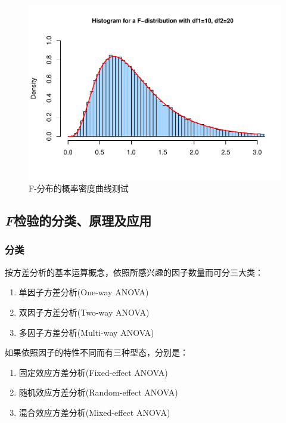 \documentclass[
]{article}
\providecommand{\tightlist}{%
  \setlength{\itemsep}{0pt}\setlength{\parskip}{0pt}}
\begin{document}
\begin{figure}

{\centering \includegraphics[width=0.49\linewidth]{figs/fdistri} 

}

\caption{F-分布的概率密度曲线测试}\label{fig:fdistri}
\end{figure}

\hypertarget{fux68c0ux9a8cux7684ux5206ux7c7bux539fux7406ux53caux5e94ux7528}{%
\subsection{\texorpdfstring{\emph{F}检验的分类、原理及应用}{F检验的分类、原理及应用}}\label{fux68c0ux9a8cux7684ux5206ux7c7bux539fux7406ux53caux5e94ux7528}}

\hypertarget{ux5206ux7c7b}{%
\subsubsection{分类}\label{ux5206ux7c7b}}

按方差分析的基本运算概念，依照所感兴趣的因子数量而可分三大类：

\begin{enumerate}
\def\labelenumi{\arabic{enumi}.}
\tightlist
\item
  单因子方差分析(One-way ANOVA)
\item
  双因子方差分析(Two-way ANOVA)
\item
  多因子方差分析(Multi-way ANOVA)
\end{enumerate}

如果依照因子的特性不同而有三种型态，分别是：

\begin{enumerate}
\def\labelenumi{\arabic{enumi}.}
\tightlist
\item
  固定效应方差分析(Fixed-effect ANOVA)
\item
  随机效应方差分析(Random-effect ANOVA)
\item
  混合效应方差分析(Mixed-effect ANOVA)
\end{enumerate}
\end{document}
